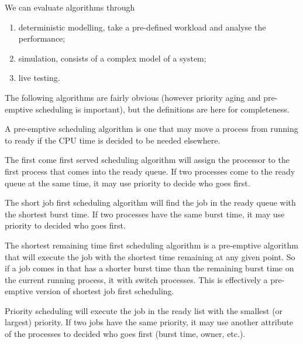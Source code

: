 We can evaluate algorithms through
\begin{enumerate}
    \item deterministic modelling, take a pre-defined workload and analyse the performance;
    \item simulation, consists of a complex model of a system;
    \item live testing.
\end{enumerate}

The following algorithms are fairly obvious (however priority aging and pre-emptive scheduling is important), but the definitions are here for completeness.


\begin{definition}
    A pre-emptive scheduling algorithm is one that may move a process from running to ready if the CPU time is decided to be needed elsewhere.
\end{definition}

\begin{definition}
    The first come first served scheduling algorithm will assign the processor to the first process that comes into the ready queue. If two processes come to the ready queue at the same time, it may use priority to decide who goes first.
\end{definition}

\begin{definition}
    The short job first scheduling algorithm will find the job in the ready queue with the shortest burst time. If two processes have the same burst time, it may use priority to decided who goes first.
\end{definition}

\begin{definition}
    The shortest remaining time first scheduling algorithm is a pre-emptive algorithm that will execute the job with the shortest time remaining at any given point. So if a job comes in that has a shorter burst time than the remaining burst time on the current running process, it with switch processes. This is effectively a pre-emptive version of shortest job first scheduling.
\end{definition}

\begin{definition}
    Priority scheduling will execute the job in the ready list with the smallest (or largest) priority. If two jobs have the same priority, it may use another attribute of the processes to decided who goes first (burst time, owner, etc.).
\end{definition}

